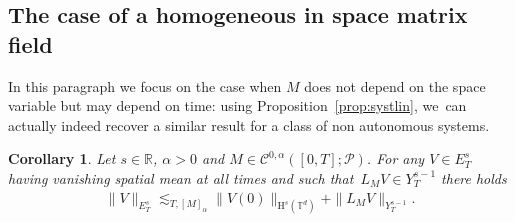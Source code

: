 \documentclass[10pt]{amsart}
\newtheorem{coro}[prop]{Corollary}
\theoremstyle{definition}
\newcommand\R{\mathbb{R}}
\newcommand\T{\mathbb{T}}
\renewcommand\H{\mathrm{H}}
\begin{document}
\subsection{The case of a homogeneous in space matrix field}\label{sct:homogeneous}
In this paragraph we focus on the case when $M$ does not depend on the space variable but may depend on time: using Proposition~\ref{prop:systlin}, we~can actually indeed recover a similar result for a class of non autonomous systems.
\begin{coro}\label{coro:systlinbis}
Let $s\in\R$, $\alpha>0$ and $M\in {\mathscr{C}^{0,\alpha}}([0,T];\mathscr{P})$. For any $V\in E_T^s$ having vanishing spatial mean at all times and such that~$L_{M }V\in Y_T^{s-1}$ there holds
\begin{align}\label{eq:estimate non autonomous}
\|V\|_{E_T^s} \lesssim_{T,[M]_\alpha} \|V (0)\|_{\H^s(\T^d)} + \|L_{M }V\|_{Y_T^{s-1}}.
\end{align}
\end{coro}
\end{document}

